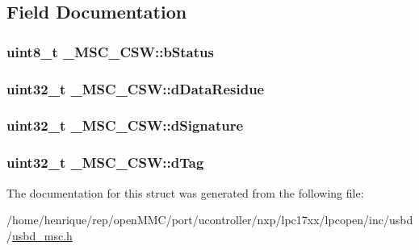 \subsection{Field Documentation}
\hypertarget{struct__MSC__CSW_a6dc520801824afdf286135b22366cbbe}{
\subsubsection[{b\-Status}]{\setlength{\rightskip}{0pt plus 5cm}uint8\-\_\-t \-\_\-\-M\-S\-C\-\_\-\-C\-S\-W\-::b\-Status}}\label{struct__MSC__CSW_a6dc520801824afdf286135b22366cbbe}
\hypertarget{struct__MSC__CSW_a58a9d983a1e1707b9a99ad1a61acae72}{
\subsubsection[{d\-Data\-Residue}]{\setlength{\rightskip}{0pt plus 5cm}uint32\-\_\-t \-\_\-\-M\-S\-C\-\_\-\-C\-S\-W\-::d\-Data\-Residue}}\label{struct__MSC__CSW_a58a9d983a1e1707b9a99ad1a61acae72}
\hypertarget{struct__MSC__CSW_ab5e9fc6fcc75f4b6e5ca7aada1443913}{
\subsubsection[{d\-Signature}]{\setlength{\rightskip}{0pt plus 5cm}uint32\-\_\-t \-\_\-\-M\-S\-C\-\_\-\-C\-S\-W\-::d\-Signature}}\label{struct__MSC__CSW_ab5e9fc6fcc75f4b6e5ca7aada1443913}
\hypertarget{struct__MSC__CSW_a6b340e8049b2f6b06d3747b42db1ebac}{
\subsubsection[{d\-Tag}]{\setlength{\rightskip}{0pt plus 5cm}uint32\-\_\-t \-\_\-\-M\-S\-C\-\_\-\-C\-S\-W\-::d\-Tag}}\label{struct__MSC__CSW_a6b340e8049b2f6b06d3747b42db1ebac}


The documentation for this struct was generated from the following file\-:\begin{DoxyCompactItemize}
\item 
/home/henrique/rep/open\-M\-M\-C/port/ucontroller/nxp/lpc17xx/lpcopen/inc/usbd/\hyperlink{usbd__msc_8h}{usbd\-\_\-msc.\-h}\end{DoxyCompactItemize}
